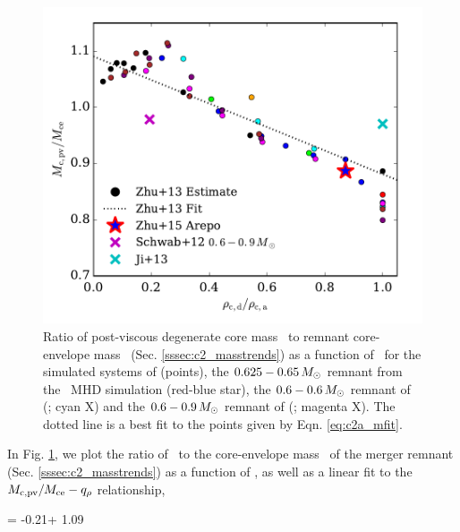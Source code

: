 \begin{figure}
\centering
\includegraphics[angle=0,width=0.6\columnwidth]{chapter2_zhu+13/figures/c2a_McMce_vs_qrho.pdf}
\caption{Ratio of post-viscous degenerate core mass \Mcpv\ to remnant core-envelope mass \Mce\ (Sec. \ref{sssec:c2_masstrends}) as a function of \qrho\ for the simulated systems of \citeal{zhu+13} (points), the $0.625 - 0.65\,\Msun$ remnant from the \arepo\ MHD simulation (red-blue star), the $0.6 - 0.6\,\Msun$ remnant of \citeauthor{ji+13} (\citeyear{ji+13}; cyan X) and the $0.6 - 0.9\,\Msun$ remnant of \citeauthor{schw+12} (\citeyear{schw+12}; magenta X).  The dotted line is a best fit to the \citeal{zhu+13} points given by Eqn. \ref{eq:c2a_mfit}.}
\label{fig:c2a_mcmce_qrho}
\end{figure}

In Fig. \ref{fig:c2a_mcmce_qrho}, we plot the ratio of \Mcpv\ to the core-envelope mass \Mce\ of the merger remnant (Sec. \ref{sssec:c2_masstrends}) as a function of \qrho, as well as a linear fit to the $\Mcpv/\Mce - \qrho$ relationship, 

\eqbegin
\frac{\Mcpv}{\Mce} = -0.21\qrho + 1.09
\label{eq:c2a_mfit}
\eqend

